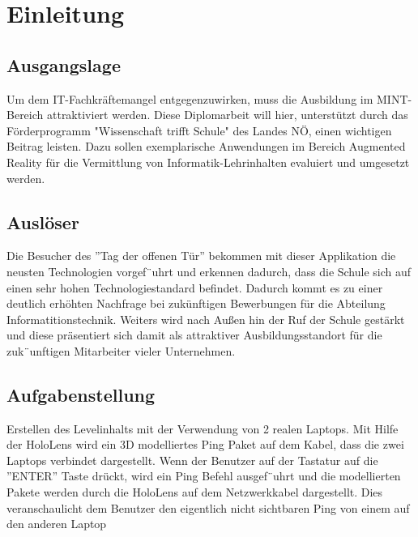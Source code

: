 \chapter{Einleitung}
\label{cha:Einleitung}

\section{Ausgangslage}
Um dem IT-Fachkräftemangel entgegenzuwirken, muss die Ausbildung im
MINT-Bereich attraktiviert werden. Diese Diplomarbeit will hier, unterstützt
durch das Förderprogramm "Wissenschaft trifft Schule" des Landes NÖ, einen
wichtigen Beitrag leisten. Dazu sollen exemplarische Anwendungen im Bereich
Augmented Reality für die Vermittlung von Informatik-Lehrinhalten evaluiert und
umgesetzt werden.

\section{Auslöser}
Die Besucher des ”Tag der offenen Tür” bekommen mit dieser Applikation die neusten
Technologien vorgef¨uhrt und erkennen dadurch, dass die Schule sich auf einen sehr hohen
Technologiestandard befindet. Dadurch kommt es zu einer deutlich erhöhten Nachfrage
bei zukünftigen Bewerbungen für die Abteilung Informatitionstechnik. Weiters wird nach
Außen hin der Ruf der Schule gestärkt und diese präsentiert sich damit als attraktiver
Ausbildungsstandort für die zuk¨unftigen Mitarbeiter vieler Unternehmen.

\section{Aufgabenstellung}
Erstellen des Levelinhalts mit der Verwendung von 2 realen Laptops. Mit
Hilfe der HoloLens wird ein 3D modelliertes Ping Paket auf dem Kabel, dass
die zwei Laptops verbindet dargestellt. Wenn der Benutzer auf der Tastatur auf
die ”ENTER” Taste drückt, wird ein Ping Befehl ausgef¨uhrt und die modellierten
Pakete werden durch die HoloLens auf dem Netzwerkkabel dargestellt. Dies veranschaulicht
dem Benutzer den eigentlich nicht sichtbaren Ping von einem auf den anderen Laptop

